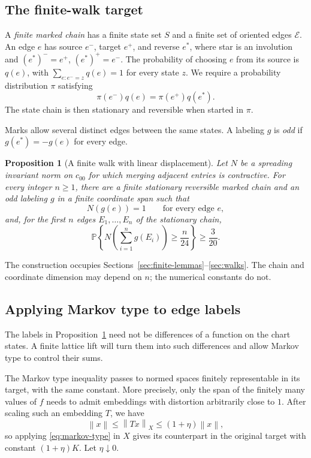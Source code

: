 \documentclass[11pt]{article}
\newtheorem{proposition}[theorem]{Proposition}
\theoremstyle{definition}
\theoremstyle{remark}
\newcommand{\Prob}{\mathbb P}
\newcommand{\norm}[1]{\left\lVert #1\right\rVert}
\begin{document}
\subsection{The finite-walk target}

A \emph{finite marked chain} has a finite state set
$S$ and a finite set of oriented edges $\mathcal E$. An edge $e$ has
source $e^-$, target $e^+$, and reverse $e^*$, where star is an involution
and $(e^*)^-=e^+$, $(e^*)^+=e^-$. The probability of choosing $e$ from
its source is $q(e)$, with $\sum_{e:e^-=z}q(e)=1$ for every state $z$.
We require a probability distribution $\pi$ satisfying
\begin{equation}\label{eq:edge-balance}
 \pi(e^-)q(e)=\pi(e^+)q(e^*).
\end{equation}
The state chain is then stationary and reversible when started in $\pi$.

Marks allow several distinct edges between the same states.
A labeling $g$ is \emph{odd} if $g(e^*)=-g(e)$ for every edge.

\begin{proposition}[A finite walk with linear displacement]\label{prop:walks}
Let $N$ be a spreading invariant norm on $c_{00}$ for which merging
adjacent entries is contractive. For every integer $n\geq1$, there are
a finite stationary reversible marked chain and an odd labeling $g$
in a finite coordinate span such that
\[
 N(g(e))=1\qquad\text{for every edge }e,
\]
and, for the first $n$ edges $E_1,\ldots,E_n$ of the stationary chain,
\begin{equation}\label{eq:unit-walk}
 \Prob\left\{N\left(\sum_{i=1}^n g(E_i)\right)
                 \geq\frac n{24}\right\}\geq\frac3{20}.
\end{equation}
\end{proposition}

The construction occupies Sections~\ref{sec:finite-lemmas}--\ref{sec:walks}.
The chain and coordinate dimension may depend on $n$; the numerical
constants do not.

\subsection{Applying Markov type to edge labels}

The labels in Proposition~\ref{prop:walks} need not be differences of a
function on the chart states. A finite lattice lift will turn them into
such differences and allow Markov type to control their sums.

The Markov type inequality passes to normed spaces finitely representable
in its target, with the same constant. More precisely, only the span of
the finitely many values of $f$ needs to admit embeddings with distortion
arbitrarily close to $1$. After scaling such an embedding $T$, we have
\[
 \norm{x}\leq\norm{Tx}_X\leq(1+\eta)\norm{x},
\]
so applying \eqref{eq:markov-type} in $X$ gives its counterpart in the
original target with constant $(1+\eta)K$. Let $\eta\downarrow0$.
\end{document}
